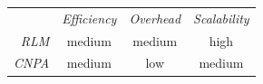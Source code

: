 \begin{center}
{\footnotesize
\begin{tabular}{rccc}
\multicolumn{1}{r}{} &
\multicolumn{1}{c}{\emph{Efficiency}} &
\multicolumn{1}{c}{\emph{Overhead}} &
\multicolumn{1}{c}{\emph{Scalability}}
\\
\cline{2-4}
\emph{RLM} &
medium &
%
medium &
high \\
\emph{CNPA} &
%
medium &
low &
medium \\
\end{tabular}
}
\end{center}


